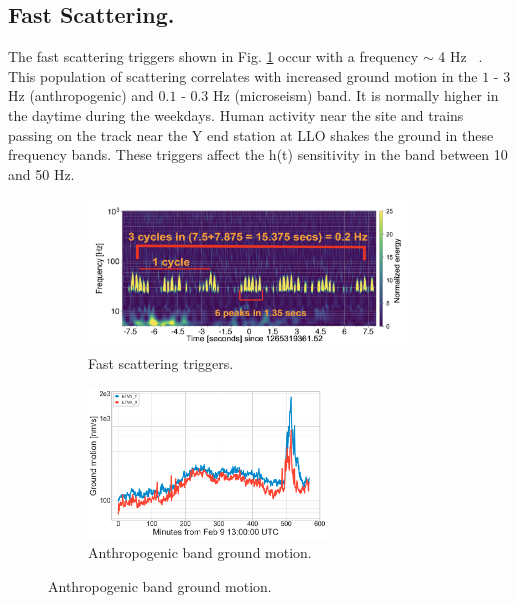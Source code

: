 \documentclass[12pt]{iopart}
\begin{document}
\subsection{Fast Scattering.}
The fast scattering triggers shown in Fig. \ref{fig:fastscat} occur with a frequency $\sim$ 4 Hz ~\cite{alogjosh}. This population of scattering correlates with increased ground motion in the  $1$ - $3$ Hz (anthropogenic) and $0.1$ - $0.3$ Hz (microseism) band. It is normally higher in the daytime during the weekdays. Human activity near the site and trains passing on the track near the Y end station at LLO shakes the ground in these frequency bands. 
These triggers affect the h(t) sensitivity in the band between 10 and 50 Hz.
\begin{figure}
\captionsetup[subfigure]{font=scriptsize,labelfont=scriptsize}
   \begin{minipage}{0.5\textwidth}
   \begin{subfigure}[b]{\textwidth}
        \centering
         \includegraphics[width=\textwidth,height=4cm]{fast_scat11.png}
         \caption{Fast scattering triggers.}
         \label{fig:fastscat}
    \end{subfigure}
    \end{minipage}
    \begin{minipage}{0.5\textwidth}
    \begin{subfigure}{\textwidth}
    \includegraphics[width=\textwidth,height=4cm]{anthro_motion1.png}
    \caption{Anthropogenic band ground motion.} \label{subfig:anthro}
    \end{subfigure}


\end{minipage}
\end{figure}
\end{document}

